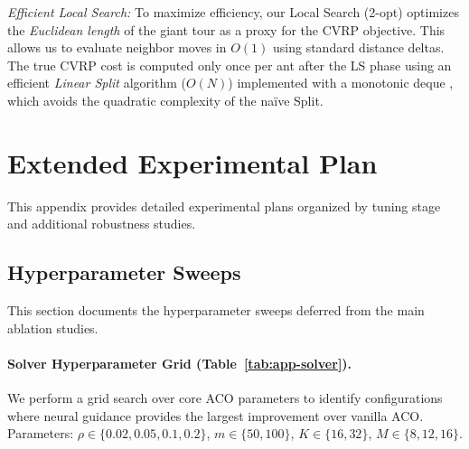 \documentclass[sigconf,anonymous,review]{acmart}
\theoremstyle{definition}
\theoremstyle{plain}
\begin{document}
\emph{Efficient Local Search:}
To maximize efficiency, our Local Search (2-opt) optimizes the \emph{Euclidean length} of the giant tour as a proxy for the CVRP objective. This allows us to evaluate neighbor moves in $O(1)$ using standard distance deltas. The true CVRP cost is computed only once per ant after the LS phase using an efficient \emph{Linear Split} algorithm ($O(N)$) implemented with a monotonic deque \cite{prins2004}, which avoids the quadratic complexity of the naïve Split.

\section{Extended Experimental Plan}
\label{app:experiments}
This appendix provides detailed experimental plans organized by tuning stage and additional robustness studies.

\subsection{Hyperparameter Sweeps}
\label{app:tuning}
This section documents the hyperparameter sweeps deferred from the main ablation studies.

\paragraph{Solver Hyperparameter Grid (Table~\ref{tab:app-solver}).}
We perform a grid search over core ACO parameters to identify configurations where neural guidance provides the largest improvement over vanilla ACO.
Parameters: $\rho \in \{0.02, 0.05, 0.1, 0.2\}$, $m \in \{50, 100\}$, $K \in \{16, 32\}$, $M \in \{8, 12, 16\}$.

\begin{table}[h]
\centering
\caption{Solver hyperparameter sensitivity. Showing top-5 configurations ranked by neural improvement over vanilla.}
\label{tab:app-solver}
\end{table}
\end{document}
